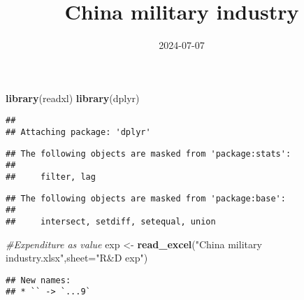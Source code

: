 \documentclass[
]{article}
\title{China military industry}
\author{}
\date{\vspace{-2.5em}2024-07-07}
\newenvironment{Shaded}{\begin{snugshade}}{\end{snugshade}}
\newcommand{\AttributeTok}[1]{\textcolor[rgb]{0.13,0.29,0.53}{#1}}
\newcommand{\CommentTok}[1]{\textcolor[rgb]{0.56,0.35,0.01}{\textit{#1}}}
\newcommand{\FunctionTok}[1]{\textcolor[rgb]{0.13,0.29,0.53}{\textbf{#1}}}
\newcommand{\NormalTok}[1]{#1}
\newcommand{\OtherTok}[1]{\textcolor[rgb]{0.56,0.35,0.01}{#1}}
\newcommand{\StringTok}[1]{\textcolor[rgb]{0.31,0.60,0.02}{#1}}
\begin{document}
\maketitle

\begin{Shaded}
\begin{Highlighting}[]
\FunctionTok{library}\NormalTok{(readxl)}
\FunctionTok{library}\NormalTok{(dplyr)}
\end{Highlighting}
\end{Shaded}

\begin{verbatim}
## 
## Attaching package: 'dplyr'
\end{verbatim}

\begin{verbatim}
## The following objects are masked from 'package:stats':
## 
##     filter, lag
\end{verbatim}

\begin{verbatim}
## The following objects are masked from 'package:base':
## 
##     intersect, setdiff, setequal, union
\end{verbatim}

\begin{Shaded}
\begin{Highlighting}[]
\CommentTok{\#Expenditure as value}
\NormalTok{exp }\OtherTok{\textless{}{-}} \FunctionTok{read\_excel}\NormalTok{(}\StringTok{"China military industry.xlsx"}\NormalTok{,}\AttributeTok{sheet=}\StringTok{"R\&D exp"}\NormalTok{)}
\end{Highlighting}
\end{Shaded}

\begin{verbatim}
## New names:
## * `` -> `...9`
\end{verbatim}
\end{document}
